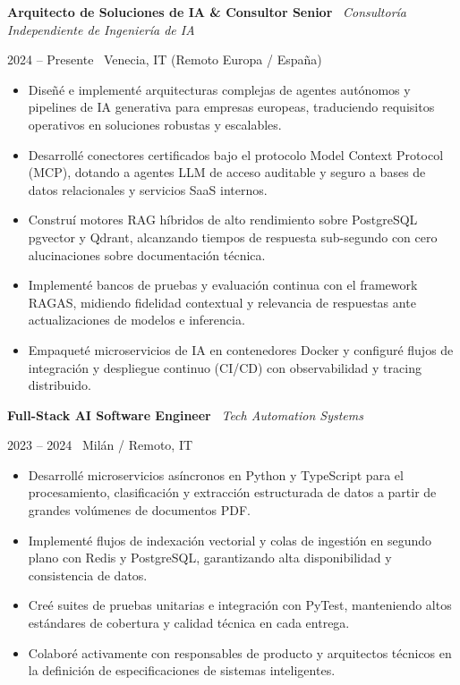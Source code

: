 \documentclass[a4paper,10pt]{article}
\newcommand{\role}[4]{%
  \vspace{2pt}\noindent
  \begin{minipage}[t]{0.70\textwidth}\raggedright\textbf{#1} \textbullet\ \textit{#3}\end{minipage}%
  \hfill
  \begin{minipage}[t]{0.28\textwidth}\raggedleft\footnotesize\color{gray}#2 \textbullet\ #4\end{minipage}%
  \vspace{1pt}%
}
\begin{document}
\role{Arquitecto de Soluciones de IA \& Consultor Senior}{2024 -- Presente}{Consultoría Independiente de Ingeniería de IA}{Venecia, IT (Remoto Europa / España)}
\begin{itemize}
  \item Diseñé e implementé arquitecturas complejas de agentes autónomos y pipelines de IA generativa para empresas europeas, traduciendo requisitos operativos en soluciones robustas y escalables.
  \item Desarrollé conectores certificados bajo el protocolo Model Context Protocol (MCP), dotando a agentes LLM de acceso auditable y seguro a bases de datos relacionales y servicios SaaS internos.
  \item Construí motores RAG híbridos de alto rendimiento sobre PostgreSQL pgvector y Qdrant, alcanzando tiempos de respuesta sub-segundo con cero alucinaciones sobre documentación técnica.
  \item Implementé bancos de pruebas y evaluación continua con el framework RAGAS, midiendo fidelidad contextual y relevancia de respuestas ante actualizaciones de modelos e inferencia.
  \item Empaqueté microservicios de IA en contenedores Docker y configuré flujos de integración y despliegue continuo (CI/CD) con observabilidad y tracing distribuido.
\end{itemize}

\vspace{3pt}
\role{Full-Stack AI Software Engineer}{2023 -- 2024}{Tech Automation Systems}{Milán / Remoto, IT}
\begin{itemize}
  \item Desarrollé microservicios asíncronos en Python y TypeScript para el procesamiento, clasificación y extracción estructurada de datos a partir de grandes volúmenes de documentos PDF.
  \item Implementé flujos de indexación vectorial y colas de ingestión en segundo plano con Redis y PostgreSQL, garantizando alta disponibilidad y consistencia de datos.
  \item Creé suites de pruebas unitarias e integración con PyTest, manteniendo altos estándares de cobertura y calidad técnica en cada entrega.
  \item Colaboré activamente con responsables de producto y arquitectos técnicos en la definición de especificaciones de sistemas inteligentes.
\end{itemize}

\end{document}
